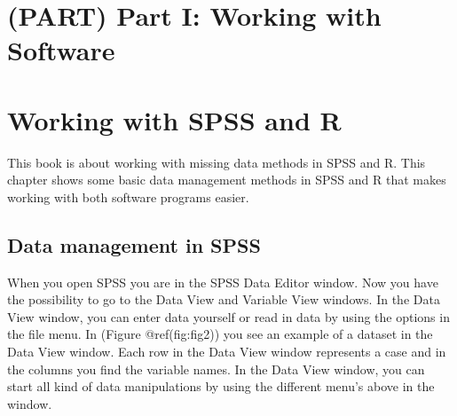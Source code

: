 \documentclass[
]{book}
\begin{document}
\hypertarget{part-part-i-working-with-software}{%
\chapter*{(PART) Part I: Working with
Software}\label{part-part-i-working-with-software}}

\hypertarget{working-with-spss-and-r}{%
\chapter{Working with SPSS and R}\label{working-with-spss-and-r}}

This book is about working with missing data methods in SPSS and R. This
chapter shows some basic data management methods in SPSS and R that
makes working with both software programs easier.

\hypertarget{data-management-in-spss}{%
\section{Data management in SPSS}\label{data-management-in-spss}}

When you open SPSS you are in the SPSS Data Editor window. Now you have
the possibility to go to the Data View and Variable View windows. In the
Data View window, you can enter data yourself or read in data by using
the options in the file menu. In (Figure @ref(fig:fig2)) you see an
example of a dataset in the Data View window. Each row in the Data View
window represents a case and in the columns you find the variable names.
In the Data View window, you can start all kind of data manipulations by
using the different menu's above in the window.
\end{document}
